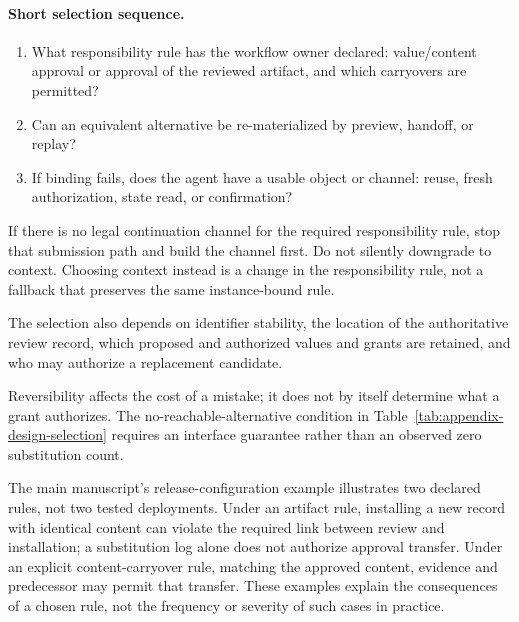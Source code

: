 \paragraph{Short selection sequence.}
\begin{enumerate}
\item What responsibility rule has the workflow owner declared: value/content approval or approval of the reviewed artifact, and which carryovers are permitted?
\item Can an equivalent alternative be re-materialized by preview, handoff, or replay?
\item If binding fails, does the agent have a usable object or channel: reuse, fresh authorization, state read, or confirmation?
\end{enumerate}
If there is no legal continuation channel for the required responsibility rule, stop that submission path and build the channel first. Do not silently downgrade to context. Choosing context instead is a change in the responsibility rule, not a fallback that preserves the same instance-bound rule.

The selection also depends on identifier stability, the location of the authoritative review record, which proposed and authorized values and grants are retained, and who may authorize a replacement candidate.

Reversibility affects the cost of a mistake; it does not by itself determine what a grant authorizes. The no-reachable-alternative condition in Table~\ref{tab:appendix-design-selection} requires an interface guarantee rather than an observed zero substitution count.

The main manuscript's release-configuration example illustrates two declared rules, not two tested deployments. Under an artifact rule, installing a new record with identical content can violate the required link between review and installation; a substitution log alone does not authorize approval transfer. Under an explicit content-carryover rule, matching the approved content, evidence and predecessor may permit that transfer. These examples explain the consequences of a chosen rule, not the frequency or severity of such cases in practice.

